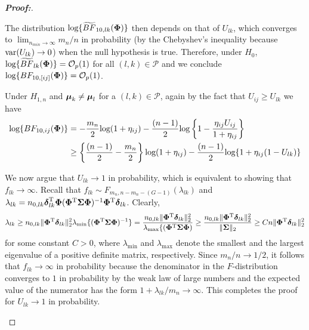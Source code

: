 \documentclass[alpha-refs]{wiley-article}
\theoremstyle{plain}%
\theoremstyle{definition}
\def\log{\hbox{log}}
\def\var{\hbox{var}}
\def\log{\hbox{log}}
\def\var{\hbox{var}}
\def\be{\begin{eqnarray}}
\def\ee{\end{eqnarray}}
\def\trans{^{\rm T}}
\newcommand{\bSigma}{\mbox{\boldmath $\Sigma$}}
\newcommand{\udelta}            {\mbox{\boldmath$\delta$}}
\newcommand{\umu}               {\mbox{\boldmath$\mu$}}
\newcommand{\uPhi}              {\mbox{\boldmath$\Phi$}}
\begin{document}
\begin{proof}[\textbf{\upshape Proof:}]
\begin{description}
The distribution $ \log\{\widetilde{BF}_{10, lk}(\uPhi) \}$ then depends on that of $U_{lk}$, which
converges to $\lim_{n_{min}\to\infty}m_n/n$ in probability (by the Chebyshev's inequality because $\var(U_{lk})\to 0$)
when the null hypothesis is true.
Therefore, under $H_0$, $\log\{\widetilde{BF}_{lk}(\uPhi) \} = \mathcal{O}_{p}(1)$ for all $(l, k)\in\mathcal{P}$ and we conclude $\log\{BF_{10,[ij]}(\uPhi) \} = \mathcal{O}_{p}(1)$.

Under $H_{1,n}$ and $\umu_{k} \neq \umu_{l}$ for a $(l, k) \in \mathcal{P}$, again 
by the fact that $U_{ij}\geq U_{lk}$ 
we have
\begin{align*}
    \log\{BF_{10,ij}(\uPhi) \} &= -\frac{m_n}{2}\log(1 + \eta_{ij}) - \frac{(n-1)}{2}\log\left\{ 1 - \frac{\eta_{ij} U_{ij}}{1 + \eta_{ij}} \right\}\\
    & \geq \left\{\frac{(n - 1)}{2} - \frac{m_n}{2}\right\}\log(1 + \eta_{ij}) - \frac{(n - 1)}{2}\log\{1 + \eta_{ij}(1 - U_{lk})\}
\end{align*}
{\color{black}
We now argue that $U_{lk}\to 1$ in probability, which is equivalent to showing that $f_{lk}\to\infty$. Recall that $f_{lk}\sim F_{m_n, n - m_n - (G - 1)}(\lambda_{lk})$ and $\lambda_{lk} = n_{0,lk}\udelta_{lk}\trans\mathbf{\Phi}(\mathbf{\Phi}\trans\bSigma\mathbf{\Phi})^{-1}\mathbf{\Phi}\trans\udelta_{lk}$. Clearly,
\[
\lambda_{lk} \geq n_{0,lk}\|\mathbf{\Phi}\trans\udelta_{lk}\|_2^2\lambda_{\min}\{(\mathbf{\Phi}\trans\bSigma\mathbf{\Phi})^{-1}\}
= \frac{n_{0,lk}\|\mathbf{\Phi}\trans\udelta_{lk}\|_2^2}{\lambda_{\max}\{(\mathbf{\Phi}\trans\bSigma\mathbf{\Phi})}\geq \frac{n_{0,lk}\|\mathbf{\Phi}\trans\udelta_{lk}\|_2^2}{\|\bSigma\|_2} \geq Cn\|\mathbf{\Phi}\trans\udelta_{lk}\|_2^2 
\]
for some constant $C > 0$, where $\lambda_{\min}$ and $\lambda_{\max}$ denote the smallest and the largest eigenvalue of a positive definite matrix, respectively. 
Since $m_n/n\to 1/2$, it follows that $f_{lk}\to \infty$ in probability because the denominator in the $F$-distribution converges to $1$ in probability by the weak law of large numbers and the expected value of the numerator has the form $1 + \lambda_{lk}/m_n\to\infty$. This completes the proof for $U_{lk}\to 1$ in probability. 

}
\end{description}
\end{proof}
\end{document}
